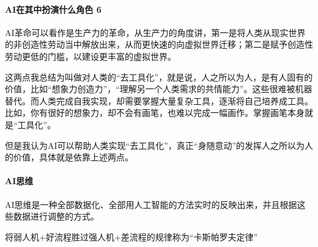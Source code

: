 \documentclass[letterpaper,10pt,english]{sphinxmanual}
\begin{document}
\paragraph{AI在其中扮演什么角色 6\sphinxfootnotemark[224]}
\label{\detokenize{chapter_introduction/AI:ai-6}}%
\begin{footnotetext}[224]\sphinxAtStartFootnote
{}
%
\end{footnotetext}\ignorespaces 
AI革命可以看作是生产力的革命，从生产力的角度讲，第一是将人类从现实世界的非创造性劳动当中解放出来，从而更快速的向虚拟世界迁移；第二是赋予创造性劳动更低的门槛，以建设更丰富的虚拟世界。

这两点我总结为叫做对人类的“去工具化”，就是说，人之所以为人，是有人固有的价值，比如“想象力创造力”，“理解另一个人类需求的共情能力”。这些很难被机器替代。而人类完成自我实现，却需要掌握大量复杂工具，逐渐将自己培养成工具。比如，你有很好的想象力，却不会有画笔，也难以完成一幅画作。掌握画笔本身就是“工具化”。

但是我认为AI可以帮助人类实现“去工具化”，真正“身随意动”的发挥人之所以为人的价值，具体就是依靠上述两点。


\paragraph{AI思维}
\label{\detokenize{chapter_introduction/AI:id14}}
AI思维是一种全部数据化、全部用人工智能的方法实时的反映出来，并且根据这些数据进行调整的方式。%
\begin{footnote}[225]\sphinxAtStartFootnote
{}
%
\end{footnote}

将弱人机+好流程胜过强人机+差流程的规律称为“卡斯帕罗夫定律”%
\begin{footnote}[226]\sphinxAtStartFootnote
{}
%
\end{footnote}
\end{document}
